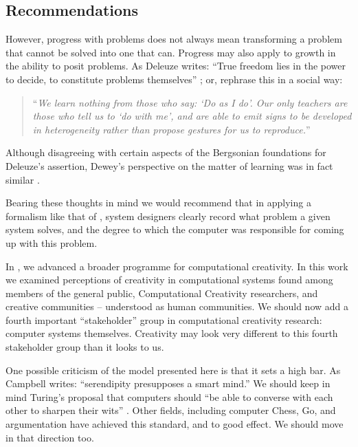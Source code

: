 \subsection{Recommendations} \label{sec:recommendations}


%
However, progress with problems does not always mean transforming a
problem that cannot be solved into one that can.  Progress may also
apply to growth in the ability to posit problems.  As Deleuze writes:
``True freedom lies in the power to decide, to constitute problems
themselves'' \cite[p. 15]{deleuze1991bergsonism}; or, rephrase this in
a social way:
\begin{quote}
``\emph{We learn nothing from those who say: `Do as I do'. Our only teachers
  are those who tell us to `do with me', and are able to emit signs to
  be developed in heterogeneity rather than propose gestures for us to
  reproduce.}''~\cite[p. 26]{deleuze1994difference}
\end{quote}
Although disagreeing with certain aspects of the Bergsonian
foundations for Deleuze's assertion, Dewey's perspective on the matter
of learning was in fact similar \cite[p. 73]{dewey-by-mead}.

Bearing these thoughts in mind we would recommend that in applying a
formalism like that of \cite{colton-assessingprogress}, system
designers clearly record what problem a given system solves, and the
degree to which the computer was responsible for coming up with this
problem.

In \cite{stakeholder-groups-bookchapter}, we advanced a broader
programme for computational creativity.  In this work we examined
perceptions of creativity in computational systems found among members
of the general public, Computational Creativity researchers, and
creative communities -- understood as human communities.  We should
now add a fourth important ``stakeholder'' group in computational
creativity research: computer systems themselves.  Creativity may look
very different to this fourth stakeholder group than it looks to us.

One possible criticism of the model presented here is that it sets a
high bar.  As Campbell \citeyear{campbell} writes: ``serendipity
presupposes a smart mind.''  We should keep in mind Turing's proposal
that computers should ``be able to converse with each other to sharpen
their wits'' \cite{turing-intelligent}.  Other fields, including
computer Chess, Go, and argumentation have achieved this standard, and
to good effect.  We should move in that direction too.

